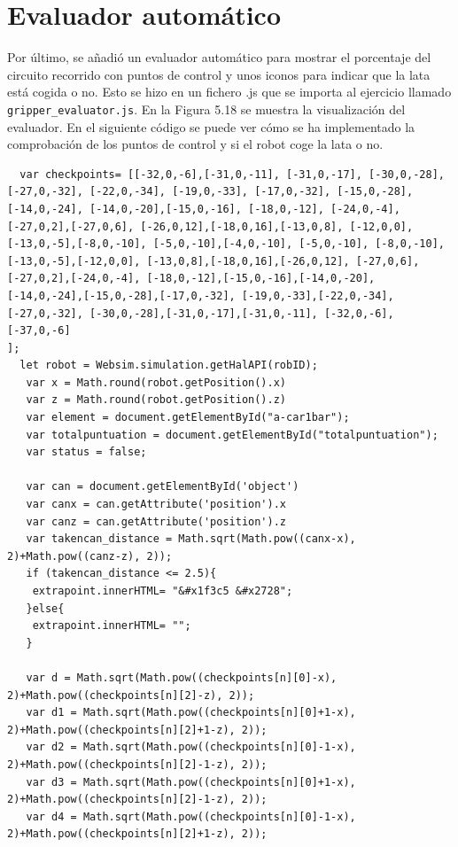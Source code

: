 \section{Evaluador automático}

Por último, se añadió un evaluador automático para mostrar el porcentaje del circuito recorrido con puntos de control y unos iconos para indicar que la lata está cogida o no. Esto se hizo en un fichero .js que se importa al ejercicio llamado \texttt{gripper\_evaluator.js}. En la Figura 5.18 se muestra la visualización del evaluador. En el siguiente código se puede ver cómo se ha implementado la comprobación de los puntos de control y si el robot coge la lata o no.


\begin{lstlisting}
  var checkpoints= [[-32,0,-6],[-31,0,-11], [-31,0,-17], [-30,0,-28],  [-27,0,-32], [-22,0,-34], [-19,0,-33], [-17,0,-32], [-15,0,-28], [-14,0,-24], [-14,0,-20],[-15,0,-16], [-18,0,-12], [-24,0,-4],[-27,0,2],[-27,0,6], [-26,0,12],[-18,0,16],[-13,0,8], [-12,0,0],[-13,0,-5],[-8,0,-10], [-5,0,-10],[-4,0,-10], [-5,0,-10], [-8,0,-10],[-13,0,-5],[-12,0,0], [-13,0,8],[-18,0,16],[-26,0,12], [-27,0,6],[-27,0,2],[-24,0,-4], [-18,0,-12],[-15,0,-16],[-14,0,-20], [-14,0,-24],[-15,0,-28],[-17,0,-32], [-19,0,-33],[-22,0,-34],[-27,0,-32], [-30,0,-28],[-31,0,-17],[-31,0,-11], [-32,0,-6],[-37,0,-6]
];
  let robot = Websim.simulation.getHalAPI(robID);
   var x = Math.round(robot.getPosition().x)
   var z = Math.round(robot.getPosition().z)
   var element = document.getElementById("a-car1bar");
   var totalpuntuation = document.getElementById("totalpuntuation");
   var status = false;

   var can = document.getElementById('object')
   var canx = can.getAttribute('position').x
   var canz = can.getAttribute('position').z
   var takencan_distance = Math.sqrt(Math.pow((canx-x), 2)+Math.pow((canz-z), 2));
   if (takencan_distance <= 2.5){
    extrapoint.innerHTML= "&#x1f3c5 &#x2728";
   }else{
    extrapoint.innerHTML= "";
   }
   
   var d = Math.sqrt(Math.pow((checkpoints[n][0]-x), 2)+Math.pow((checkpoints[n][2]-z), 2));
   var d1 = Math.sqrt(Math.pow((checkpoints[n][0]+1-x), 2)+Math.pow((checkpoints[n][2]+1-z), 2));
   var d2 = Math.sqrt(Math.pow((checkpoints[n][0]-1-x), 2)+Math.pow((checkpoints[n][2]-1-z), 2));
   var d3 = Math.sqrt(Math.pow((checkpoints[n][0]+1-x), 2)+Math.pow((checkpoints[n][2]-1-z), 2));
   var d4 = Math.sqrt(Math.pow((checkpoints[n][0]-1-x), 2)+Math.pow((checkpoints[n][2]+1-z), 2));
	

\end{lstlisting}
